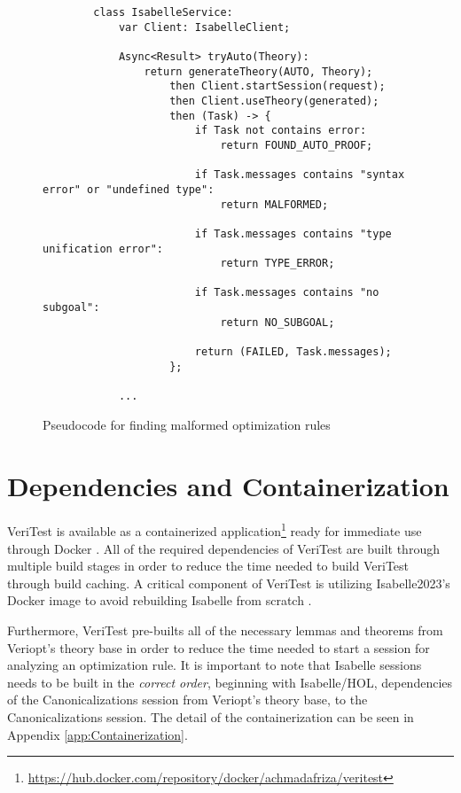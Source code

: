 \begin{figure}[!htb]
    \begin{lstlisting}
        class IsabelleService:
            var Client: IsabelleClient;
            
            Async<Result> tryAuto(Theory):
                return generateTheory(AUTO, Theory);
                    then Client.startSession(request);
                    then Client.useTheory(generated);
                    then (Task) -> {
                        if Task not contains error:
                            return FOUND_AUTO_PROOF;

                        if Task.messages contains "syntax error" or "undefined type":
                            return MALFORMED;
                        
                        if Task.messages contains "type unification error":
                            return TYPE_ERROR;

                        if Task.messages contains "no subgoal":
                            return NO_SUBGOAL;
                        
                        return (FAILED, Task.messages);
                    };
            
            ...
    \end{lstlisting}

    \caption{Pseudocode for finding malformed optimization rules}
    \label{fig:malformedPseudocode}
\end{figure}

\section{Dependencies and Containerization}
\label{sec:Containerization}

VeriTest is available as a containerized application\footnote{\href{https://hub.docker.com/repository/docker/achmadafriza/veritest}{https://hub.docker.com/repository/docker/achmadafriza/veritest}} 
ready for immediate use through Docker \cite{docker_inc_docker_2022}. All of the required dependencies of VeriTest are built through multiple build 
stages in order to reduce the time needed to build VeriTest through build caching. A critical component of VeriTest is utilizing Isabelle2023's Docker 
image to avoid rebuilding Isabelle from scratch \cite[Sec. 7.1]{isabelleSystem}.

Furthermore, VeriTest pre-builts all of the necessary lemmas and 
theorems from Veriopt's theory base in order to reduce the time needed to start a session for analyzing an optimization rule. It is important to note 
that Isabelle sessions needs to be built in the \emph{correct order}, beginning with Isabelle/HOL, dependencies of the Canonicalizations session from 
Veriopt's theory base, to the Canonicalizations session. The detail of the containerization can be seen in Appendix \ref{app:Containerization}.

